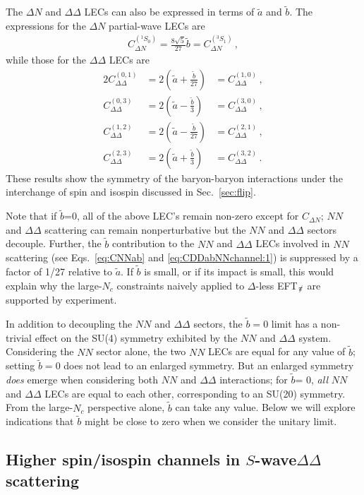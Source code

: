 \documentclass[nofootinbib, preprint, aps, prc, superscriptaddress,11pt]{revtex4-1}
\newcommand{\Nc}{\ensuremath{N_c}\xspace}
\newcommand{\NN}{\ensuremath{N\!N}\xspace}
\newcommand\Swave{$S$-wave\xspace}
\newcommand{\1}{\mathbbm{1}}
\newcommand{\CDN}{\ensuremath{C_{\Delta N}}\xspace}
\newcommand{\CNDsing}{\ensuremath{C_{\Delta N}^{(^1 \! S_0)}}\xspace}
\newcommand{\CNDtrip}{\ensuremath{C_{\Delta N}^{(^3 \! S_1)}}\xspace}
\newcommand{\at}{\ensuremath{\tilde{a}}\xspace}
\newcommand{\bt}{\ensuremath{\tilde{b}}\xspace}
\newcommand{\CDDoneSIone}{C_{\DD}^{(0,1)}}
\newcommand{\CDDoneSIthree}{C_{\DD}^{(0,3)}}
\newcommand{\CDDthreeSIzero}{C_{\DD}^{(1,0)}}
\newcommand{\CDDthreeSItwo}{C_{\DD}^{(1,2)}}
\newcommand{\CDDfiveSIone}{C_{\DD}^{(2,1)}}
\newcommand{\CDDfiveSIthree}{C_{\DD}^{(2,3)}}
\newcommand{\CDDsevenSIzero}{C_{\DD}^{(3,0)}}
\newcommand{\CDDsevenSItwo}{C_{\DD}^{(3,2)}}
\newcommand{\nopi}{\ensuremath{\pi\hskip-0.40em /}}
\newcommand{\eftnopi}{EFT$_{\nopi}$\xspace}
\newcommand{\D}{\ensuremath{\Delta}\xspace}
\newcommand{\DD}{\ensuremath{\Delta\Delta}\xspace}
\begin{document}
The $\D N$ and $\DD$ LECs can also be expressed in terms of \at and \bt.
The expressions for the $\D N$ partial-wave LECs are 
\begin{align}
\label{eq:CNDab}
    \CNDsing = \frac{8\sqrt{5}}{27}\bt = \CNDtrip\, , 
\end{align}
while those for the \DD LECs are 
    \begin{alignat}{2}
    \label{eq:CDDabNNchannel:1}
        \CDDoneSIone &= 2\left(\at + \frac{\bt}{27}\right) &= \CDDthreeSIzero \, , \\
    \label{eq:CDDabNNchannel:2}
        \CDDoneSIthree & = 2\left(\at - \frac{\bt}{3}\right)  &= \CDDsevenSIzero \, , \\
    \label{eq:CDDabNNchannel:3}    
        \CDDthreeSItwo & = 2\left(\at - \frac{\bt}{27}\right)  &= \CDDfiveSIone \, ,\\
    \label{eq:CDDabNNchannel:4}
        \CDDfiveSIthree & = 2\left(\at + \frac{\bt}{3}\right) &= \CDDsevenSItwo \, .
\end{alignat}
These results show the symmetry of the baryon-baryon interactions under the interchange of spin and isospin discussed in Sec.~\ref{sec:flip}.

Note that if \bt=0, all of the above LEC's remain non-zero except for \CDN; \NN and \DD scattering can remain nonperturbative but the \NN and \DD sectors decouple.
Further,  the \bt contribution to the \NN and \DD LECs  involved in \NN scattering (see Eqs.~\eqref{eq:CNNab} and \eqref{eq:CDDabNNchannel:1}) is suppressed by a factor of 1/27 relative to \at. If \bt is small, or if its impact is small, this would explain why the large-\Nc constraints naively applied to \D-less \eftnopi are supported by experiment.


In addition to decoupling the \NN and \DD sectors, the $\bt = 0$ limit has a non-trivial effect on the SU(4) symmetry exhibited by the \NN and \DD system. 
Considering the \NN sector alone, the two \NN LECs are equal for any value of \bt;  setting $\bt=0$ does not lead to an enlarged symmetry. 
But an enlarged symmetry \emph{does} emerge when considering both \NN and \DD interactions; for \bt = 0, \emph{all} \NN and \DD LECs are equal to each other, corresponding to an SU(20) symmetry. 
From the large-\Nc perspective alone, \bt can take any value. 
Below we will explore indications that \bt might be close to zero when we consider the unitary limit.


\subsection{Higher spin/isospin channels in \Swave \DD scattering}
\end{document}
